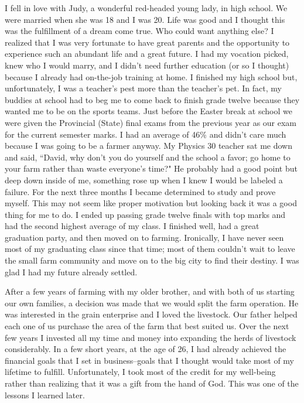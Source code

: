 \documentclass[oneside]{book}
\begin{document}
I fell in love with Judy, a wonderful red-headed young lady, in high school. We were married when she was 18 and I was 20. Life was good and I thought this was the fulfillment of a dream come true. Who could want anything else? I realized that I was very fortunate to have great parents and the opportunity to experience such an abundant life and a great future. I had my vocation picked, knew who I would marry, and I didn't need further education (or so I thought) because I already had on-the-job training at home. I finished my high school but, unfortunately, I was a teacher's pest more than the teacher's pet. In fact, my buddies at school had to beg me to come back to finish grade twelve because they wanted me to be on the sports teams. Just before the Easter break at school we were given the Provincial (State) final exams from the previous year as our exam for the current semester marks. I had an average of 46\% and didn't care much because I was going to be a farmer anyway. My Physics 30 teacher sat me down and said, ``David, why don't you do yourself and the school a favor; go home to your farm rather than waste everyone's time?" He probably had a good point but deep down inside of me, something rose up when I knew I would be labeled a failure. For the next three months I became determined to study and prove myself. This may not seem like proper motivation but looking back it was a good thing for me to do. I ended up passing grade twelve finals with top marks and had the second highest average of my class. I finished well, had a great graduation party, and then moved on to farming. Ironically, I have never seen most of my graduating class since that time; most of them couldn't wait to leave the small farm community and move on to the big city to find their destiny. I was glad I had my future already settled.

After a few years of farming with my older brother, and with both of us starting our own families, a decision was made that we would split the farm operation. He was interested in the grain enterprise and I loved the livestock. Our father helped each one of us purchase the area of the farm that best suited us. Over the next few years I invested all my time and money into expanding the herds of livestock considerably. In a few short years, at the age of 26, I had already achieved the financial goals that I set in business--goals that I thought would take most of my lifetime to fulfill. Unfortunately, I took most of the credit for my well-being rather than realizing that it was a gift from the hand of God. This was one of the lessons I learned later. 
\end{document}
